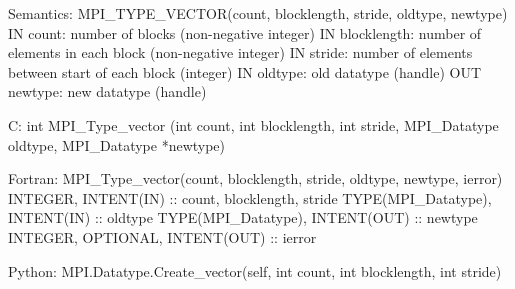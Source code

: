 Semantics:
MPI_TYPE_VECTOR(count, blocklength, stride, oldtype, newtype)
IN count: number of blocks (non-negative integer)
IN blocklength: number of elements in each block (non-negative integer)
IN stride: number of elements between start of each block (integer)
IN oldtype: old datatype (handle)
OUT newtype: new datatype (handle)

C:
int MPI_Type_vector
   (int count, int blocklength, int stride,
    MPI_Datatype oldtype, MPI_Datatype *newtype)

Fortran:
MPI_Type_vector(count, blocklength, stride, oldtype, newtype, ierror)
INTEGER, INTENT(IN) :: count, blocklength, stride
TYPE(MPI_Datatype), INTENT(IN) :: oldtype
TYPE(MPI_Datatype), INTENT(OUT) :: newtype
INTEGER, OPTIONAL, INTENT(OUT) :: ierror

Python:
MPI.Datatype.Create_vector(self, int count, int blocklength, int stride)
